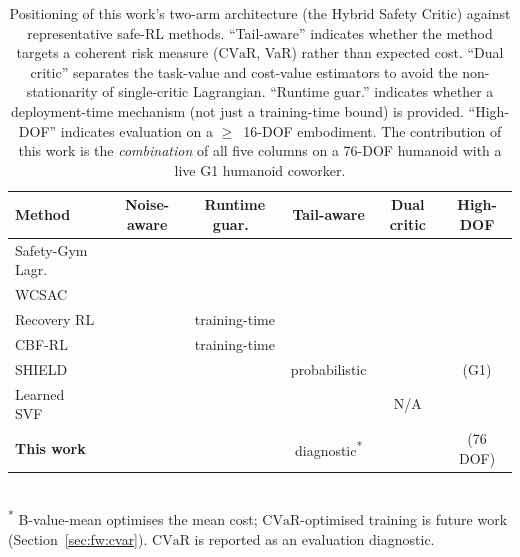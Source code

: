 \documentclass[11pt,a4paper]{report}
\newcommand{\cvar}{\ensuremath{\mathrm{CVaR}}}
\newcommand{\cmark}{\ding{51}}
\newcommand{\xmark}{\ding{55}}
\begin{document}
\begin{table}[htbp]
\centering
\caption{Positioning of this work's two-arm architecture (the Hybrid
Safety Critic) against representative safe-RL methods. ``Tail-aware'' indicates whether the
method targets a coherent risk measure (\cvar{}, VaR) rather than
expected cost. ``Dual critic'' separates the task-value and
cost-value estimators to avoid the non-stationarity of
single-critic Lagrangian. ``Runtime guar.'' indicates whether a
deployment-time mechanism (not just a training-time bound) is
provided. ``High-DOF'' indicates evaluation on a $\ge$~16-DOF
embodiment. The contribution of this work is the \emph{combination}
of all five columns on a 76-DOF humanoid with a live G1 humanoid
coworker.}
\label{tab:related-work-comparison}
\small
\begin{tabular}{lccccc}
\toprule
Method & Noise-aware & Runtime guar.\ & Tail-aware & Dual critic & High-DOF \\
\midrule
Safety-Gym Lagr.~\cite{ray2019safetygym}    & \xmark & \xmark & \xmark & \xmark & \xmark \\
WCSAC~\cite{yang2021wcsac}                  & \xmark & \xmark & \cmark & \cmark & \xmark \\
Recovery RL~\cite{thananjeyan2021recovery}  & \xmark & training-time & \xmark & \cmark & \xmark \\
CBF-RL~\cite{cbfrl2024}                     & \xmark & training-time & \xmark & \xmark & \xmark \\
SHIELD~\cite{shield2025}                    & \xmark & \cmark & probabilistic & \xmark & \cmark (G1) \\
Learned SVF~\cite{srinivasan2020learning}   & \xmark & \cmark & \xmark & N/A    & \xmark \\
\textbf{This work}                          & \cmark & \cmark & diagnostic\textsuperscript{*} & \cmark & \cmark (76 DOF) \\
\bottomrule
\end{tabular}\\
\footnotesize\textsuperscript{*} B-value-mean optimises the mean cost; \cvar{}-optimised training is future work (Section~\ref{sec:fw:cvar}). \cvar{} is reported as an evaluation diagnostic.
\end{table}
\end{document}
